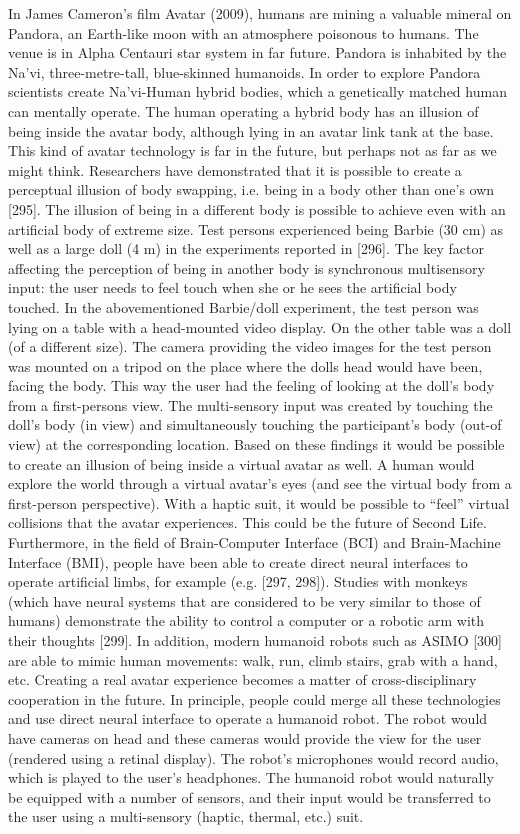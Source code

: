 In James Cameron’s film Avatar (2009), humans are mining a valuable mineral on Pandora, an Earth-like moon with an atmosphere poisonous to humans. The venue is in Alpha Centauri star system in far future. Pandora is inhabited by the Na’vi, three-metre-tall, blue-skinned humanoids. In order to explore Pandora scientists create Na’vi-Human hybrid bodies, which a genetically matched human can mentally operate. The human operating a hybrid body has an illusion of being inside the avatar body, although lying in an avatar link tank at the base. This kind of avatar technology is far in the future, but perhaps not as far as we might think. Researchers have demonstrated that it is possible to create a perceptual illusion of body swapping, i.e. being in a body other than one’s own [295]. The illusion of being in a different body is possible to achieve even with an artificial body of extreme size. Test persons experienced being Barbie (30 cm) as well as a large doll (4 m) in the experiments reported in [296]. The key factor affecting the perception of being in another body is synchronous multisensory input: the user needs to feel touch when she or he sees the artificial body touched. In the abovementioned Barbie/doll experiment, the test person was lying on a table with a head-mounted video display. On the other table was a doll (of a different size). The camera providing the video images for the test person was mounted on a tripod on the place where the dolls head would have been, facing the body. This way the user had the feeling of looking at the doll’s body from a first-persons view. The multi-sensory input was created by touching the doll’s body (in view) and simultaneously touching the participant’s body (out-of view) at the corresponding location. Based on these findings it would be possible to create an illusion of being inside a virtual avatar as well. A human would explore the world through a virtual avatar’s eyes (and see the virtual body from a first-person perspective). With a haptic suit, it would be possible to “feel” virtual collisions that the avatar experiences. This could be the future of Second Life. Furthermore, in the field of Brain-Computer Interface (BCI) and Brain-Machine Interface (BMI), people have been able to create direct neural interfaces to operate artificial limbs, for example (e.g. [297, 298]). Studies with monkeys (which have neural systems that are considered to be very similar to those of humans) demonstrate the ability to control a computer or a robotic arm with their thoughts [299]. In addition, modern humanoid robots such as ASIMO [300] are able to mimic human movements: walk, run, climb stairs, grab with a hand, etc. Creating a real avatar experience becomes a matter of cross-disciplinary cooperation in the future. In principle, people could merge all these technologies and use direct neural interface to operate a humanoid robot. The robot would have cameras on head and these cameras would provide the view for the user (rendered using a retinal display). The robot’s microphones would record audio, which is played to the user’s headphones. The humanoid robot would naturally be equipped with a number of sensors, and their input would be transferred to the user using a multi-sensory (haptic, thermal, etc.) suit.
